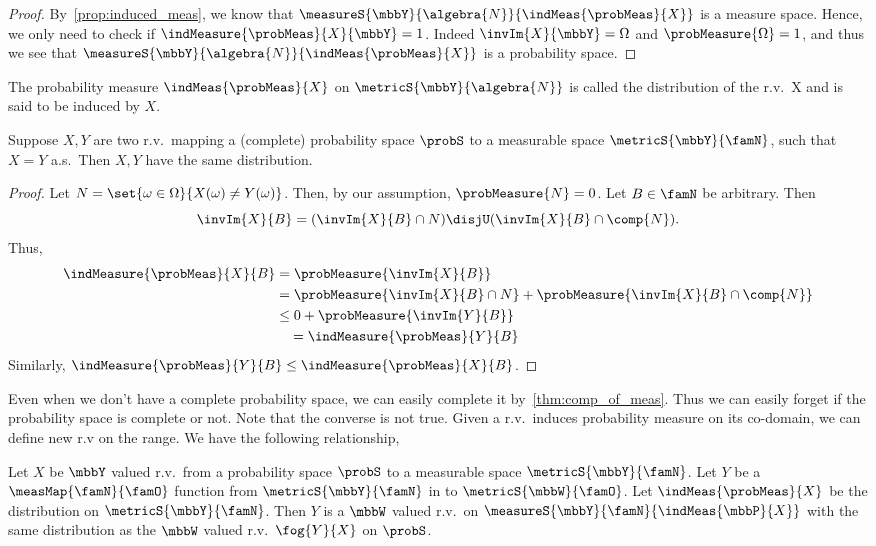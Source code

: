 \begin{proof}
    By~\ref{prop:induced_meas}, we know that $\measureS{\mbbY}{\algebra{N}}{\indMeas{\probMeas}{X}}$ is a
    measure space. Hence, we only need to check if $\indMeasure{\probMeas}{X}{\mbbY} = 1$. Indeed
    $\invIm{X}{\mbbY} = \Omega$ and $\probMeasure{\Omega} =1$, and thus we see that
    $\measureS{\mbbY}{\algebra{N}}{\indMeas{\probMeas}{X}}$ is a probability space.
\end{proof}
\begin{Definition}[name=Distribution]
    The probability measure $\indMeas{\probMeas}{X}$ on $\metricS{\mbbY}{\algebra{N}}$ is called the
    distribution of the r.v.~X and is said to be induced by $X$. 
\end{Definition}
\begin{Theorem}\label{thm:rv_equal_ae_distribution}
    Suppose $X,Y$ are two r.v.~mapping a (complete) probability space $\probS$ to a measurable space
    $\metricS{\mbbY}{\famN}$, 
    such that $X=Y$ a.s.~Then $X,Y$ have the same distribution.
\end{Theorem}
\begin{proof}
    Let $N = \set{\omega\in\Omega}{X(\omega) \neq Y(\omega)}$. Then, by our assumption, $\probMeasure{N} = 0$.
    Let $B \in \famN$ be arbitrary. Then \[\invIm{X}{B} = (\invIm{X}{B}\cap N) \disjU
    (\invIm{X}{B}\cap\comp{N}).\]
    Thus,
    \begin{align*}
	\indMeasure{\probMeas}{X}{B} &= \probMeasure{\invIm{X}{B}} \\  
	& = \probMeasure{\invIm{X}{B}\cap N} + \probMeasure{\invIm{X}{B}\cap\comp{N}} \\
	& \leq 0 + \probMeasure{\invIm{Y}{B}}\\
	&\quad = \indMeasure{\probMeas}{Y}{B}
    \end{align*}
    Similarly, $\indMeasure{\probMeas}{Y}{B} \leq \indMeasure{\probMeas}{X}{B}$.
\end{proof}
Even when we don't have a complete probability space, we can easily complete it by~\ref{thm:comp_of_meas}.
Thus we can easily forget if the probability space is complete or not. Note that the converse is not true.
Given a r.v.~induces probability measure on its co-domain, we can define new r.v on the range. We have the
following relationship,
\begin{Proposition}
    Let $X$ be $\mbbY$ valued r.v.~from a probability space $\probS$ to a 
    measurable space $\metricS{\mbbY}{\famN}$. Let $Y$ be a $\measMap{\famN}{\famO}$ 
    function from $\metricS{\mbbY}{\famN}$ in to $\metricS{\mbbW}{\famO}$. Let $\indMeas{\probMeas}{X}$ be the
    distribution on $\metricS{\mbbY}{\famN}$. Then $Y$ is a $\mbbW$ valued r.v.~on
    $\measureS{\mbbY}{\famN}{\indMeas{\mbbP}{X}}$ with the same distribution as the $\mbbW$ valued
    r.v.~$\fog{Y}{X}$ on $\probS$.
\end{Proposition}
